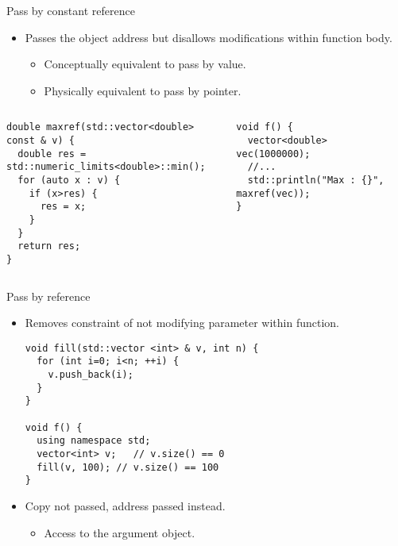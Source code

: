 \begin{frame}[t,fragile]{Pass by constant reference}
\begin{itemize}
\item Passes the object address but disallows modifications
      within function body.
  \begin{itemize}
    \item Conceptually equivalent to pass by value.
    \item Physically equivalent to pass by pointer.
  \end{itemize}
\end{itemize}

\begin{columns}[T]

\begin{lstlisting}
double maxref(std::vector<double> const & v) {
  double res = std::numeric_limits<double>::min();
  for (auto x : v) {
    if (x>res) {
      res = x;
    }
  }
  return res;
}
\end{lstlisting}

\begin{lstlisting}
void f() {
  vector<double> vec(1000000);
  //...
  std::println("Max : {}", maxref(vec));
}
\end{lstlisting}

\end{columns}
\end{frame}

\begin{frame}[t,fragile]{Pass by reference}
\begin{itemize}
  \item Removes constraint of not modifying parameter within function. 
\begin{lstlisting}
void fill(std::vector <int> & v, int n) {
  for (int i=0; i<n; ++i) {
    v.push_back(i);
  } 
}

void f() {
  using namespace std;
  vector<int> v;   // v.size() == 0
  fill(v, 100); // v.size() == 100
}
\end{lstlisting}

  \vfill
  \item Copy not passed, address passed instead.
    \begin{itemize}
      \item Access to the argument object.
    \end{itemize}
\end{itemize}
\end{frame}
